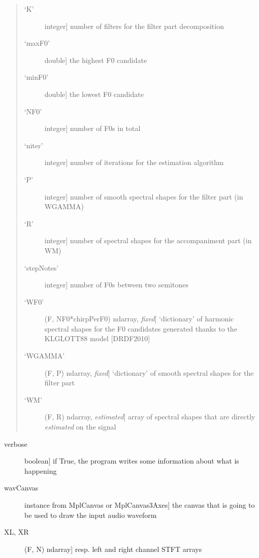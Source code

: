 \documentclass[letterpaper,10pt,english]{sphinxmanual}
\begin{document}
\begin{fulllineitems}
\begin{description}
\begin{quote}
\begin{description}
\item[{`K'}] \leavevmode{[}integer{]}
number of filters for the filter part decomposition

\item[{`maxF0'}] \leavevmode{[}double{]}
the highest F0 candidate

\item[{`minF0'}] \leavevmode{[}double{]}
the lowest F0 candidate

\item[{`NF0'}] \leavevmode{[}integer{]}
number of F0s in total

\item[{`niter'}] \leavevmode{[}integer{]}
number of iterations for the estimation algorithm

\item[{`P'}] \leavevmode{[}integer{]}
number of smooth spectral shapes for the filter part (in WGAMMA)

\item[{`R'}] \leavevmode{[}integer{]}
number of spectral shapes for the accompaniment part (in WM)

\item[{`stepNotes'}] \leavevmode{[}integer{]}
number of F0s between two semitones

\item[{`WF0'}] \leavevmode{[}(F, NF0*chirpPerF0) ndarray, \emph{fixed}{]}
`dictionary' of harmonic spectral shapes for the F0 candidates
generated thanks to the KLGLOTT88 model {[}DRDF2010{]}

\item[{`WGAMMA'}] \leavevmode{[}(F, P) ndarray, \emph{fixed}{]}
`dictionary' of smooth spectral shapes for the filter part

\item[{`WM'}] \leavevmode{[}(F, R) ndarray, \emph{estimated}{]}
array of spectral shapes that are directly \emph{estimated} on the
signal

\end{description}
\end{quote}
\begin{description}
\item[{verbose}] \leavevmode{[}boolean{]}
if True, the program writes some information about what is happening

\item[{wavCanvas}] \leavevmode{[}instance from MplCanvas or MplCanvas3Axes{]}
the canvas that is going to be used to draw the input audio waveform

\item[{XL, XR}] \leavevmode{[}(F, N) ndarray{]}
resp. left and right channel STFT arrays


\end{description}
\end{description}
\end{fulllineitems}
\end{document}
